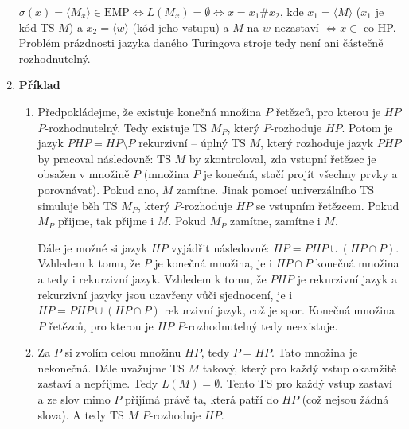 \documentclass[a4paper,12pt]{article}
\begin{document}
\begin{enumerate}[label=\textbf{\arabic*}.]
 $ \sigma(x) = \langle M_x\rangle \in\mbox{EMP} \Leftrightarrow L(M_x) = \emptyset \Leftrightarrow x = x_1\#x_2$, kde $x_1 = \langle M\rangle$ ($x_1$ je kód TS  $M$) a 
  $x_2 = \langle w\rangle$ (kód jeho vstupu) a $M$ na $w$ nezastaví $\Leftrightarrow x\in$ co-HP. Problém prázdnosti jazyka daného Turingova stroje tedy není
  ani částečně rozhodnutelný.

 \item {\bfseries Příklad}

 \begin{enumerate}
  \item Předpokládejme, že existuje konečná množina $P$ řetězců, pro kterou je $HP$ $P$-rozhodnutelný. Tedy existuje TS $M_P$, který $P$-rozhoduje $HP$. Potom 
    je jazyk $PHP = HP\setminus P$ rekurzivní -- úplný TS $M$, který rozhoduje jazyk $PHP$ by pracoval následovně: TS $M$ by zkontroloval, zda vstupní řetězec je
    obsažen v množině $P$ (množina $P$ je konečná, stačí projít všechny prvky a porovnávat). Pokud ano, $M$ zamítne. Jinak pomocí univerzálního TS
    simuluje běh TS $M_P$, který $P$-rozhoduje $HP$ se vstupním řetězcem. Pokud $M_P$ přijme, tak přijme i $M$. Pokud $M_P$ zamítne, zamítne i $M$.
    
    Dále je možné si jazyk $HP$ vyjádřit následovně: $HP = PHP \cup (HP \cap P)$. Vzhledem k tomu, že $P$ je konečná množina, je i
    $HP \cap P$ konečná množina a tedy i rekurzivní jazyk. Vzhledem k tomu, že $PHP$ je rekurzivní jazyk a rekurzivní jazyky jsou uzavřeny
    vůči sjednocení, je i $HP = PHP \cup (HP \cap P)$ rekurzivní jazyk, což je spor. Konečná množina $P$ řetězců, pro kterou je
    $HP$ $P$-rozhodnutelný tedy neexistuje.
    
  \item Za $P$ si zvolím celou množinu $HP$, tedy $P = HP$. Tato množina je nekonečná. Dále uvažujme TS $M$ takový, který pro každý
   vstup okamžitě zastaví a nepřijme. Tedy $L(M) = \emptyset$. Tento TS pro každý vstup zastaví a ze slov mimo $P$ přijímá právě ta, která patří do
   $HP$ (což nejsou žádná slova). A tedy TS $M$ $P$-rozhoduje $HP$.
   

\end{enumerate}
\end{enumerate}
\end{document}
